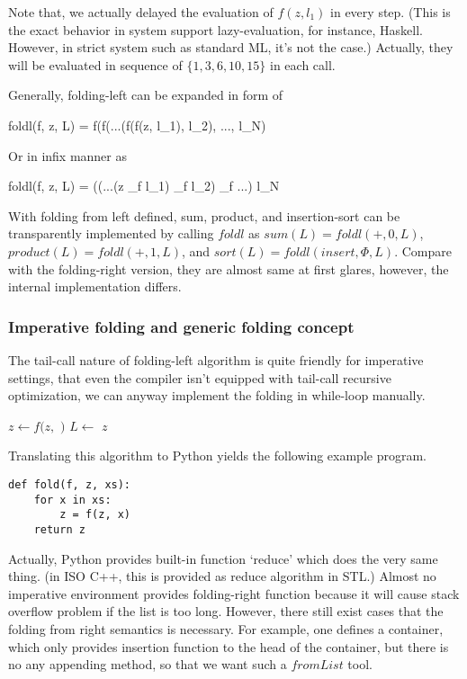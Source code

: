 \documentclass{article}
\begin{document}
Note that, we actually delayed the evaluation of $f(z, l_1)$ in every step. (This is the exact behavior
in system support lazy-evaluation, for instance, Haskell. However, in strict system such as standard ML, it's not the case.) Actually, they will be evaluated in sequence
of $\{ 1, 3, 6, 10, 15\}$ in each call.

Generally, folding-left can be expanded in form of

\be
foldl(f, z, L) = f(f(...(f(f(z, l_1), l_2), ..., l_N)
\ee

Or in infix manner as

\be
foldl(f, z, L) = ((...(z \oplus_f l_1) \oplus_f l_2) \oplus_f ...) \oplus l_N
\ee

With folding from left defined, sum, product, and insertion-sort can be transparently implemented by calling
$foldl$ as $sum(L) = foldl(+, 0, L)$, $product(L) = foldl(+, 1, L)$, and $sort(L) = foldl(insert, \Phi, L)$.
Compare with the folding-right version, they are almost same at first glares, however, the internal implementation
differs.

\subsubsection{Imperative folding and generic folding concept}
The tail-call nature of folding-left algorithm is quite friendly for imperative settings, that even the compiler
isn't equipped with tail-call recursive optimization, we can anyway implement the folding in while-loop manually.

\begin{algorithmic}
    \State $z \gets f(z, $  $)$
    \State $L \gets$ 
  \EndWhile
  \State \Return $z$
\EndFunction
\end{algorithmic}

Translating this algorithm to Python yields the following example program.

\lstset{language=Python}
\begin{lstlisting}
def fold(f, z, xs):
    for x in xs:
        z = f(z, x)
    return z
\end{lstlisting}

Actually, Python provides built-in function `reduce' which does the very same thing. (in ISO C++, this is
provided as reduce algorithm in STL.) Almost no imperative environment provides folding-right function because
it will cause stack overflow problem if the list is too long. However, there still exist cases that the folding from right
semantics is necessary. For example, one defines a container, which only provides insertion function to
the head of the container, but there is no any appending method, so that we want such a $fromList$
tool.
\end{document}
